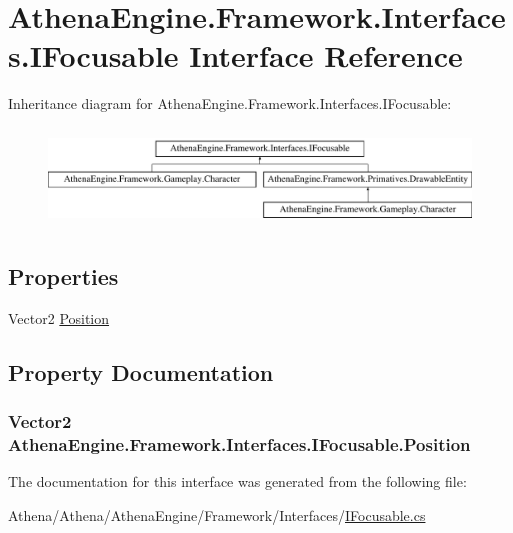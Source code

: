 \hypertarget{interface_athena_engine_1_1_framework_1_1_interfaces_1_1_i_focusable}{\section{Athena\-Engine.\-Framework.\-Interfaces.\-I\-Focusable Interface Reference}
\label{interface_athena_engine_1_1_framework_1_1_interfaces_1_1_i_focusable}
}
Inheritance diagram for Athena\-Engine.\-Framework.\-Interfaces.\-I\-Focusable\-:\begin{figure}[H]
\begin{center}
\leavevmode
\includegraphics[height=2.649842cm]{interface_athena_engine_1_1_framework_1_1_interfaces_1_1_i_focusable}
\end{center}
\end{figure}
\subsection*{Properties}
\begin{DoxyCompactItemize}
\item 
Vector2 \hyperlink{interface_athena_engine_1_1_framework_1_1_interfaces_1_1_i_focusable_a9520d4dbfc7b7ace27aec2dfce79050b}{Position}
\end{DoxyCompactItemize}


\subsection{Property Documentation}
\hypertarget{interface_athena_engine_1_1_framework_1_1_interfaces_1_1_i_focusable_a9520d4dbfc7b7ace27aec2dfce79050b}{
\subsubsection[{Position}]{\setlength{\rightskip}{0pt plus 5cm}Vector2 Athena\-Engine.\-Framework.\-Interfaces.\-I\-Focusable.\-Position\hspace{0.3cm}{\ttfamily [get]}}}\label{interface_athena_engine_1_1_framework_1_1_interfaces_1_1_i_focusable_a9520d4dbfc7b7ace27aec2dfce79050b}


The documentation for this interface was generated from the following file\-:\begin{DoxyCompactItemize}
\item 
Athena/\-Athena/\-Athena\-Engine/\-Framework/\-Interfaces/\hyperlink{_i_focusable_8cs}{I\-Focusable.\-cs}\end{DoxyCompactItemize}
